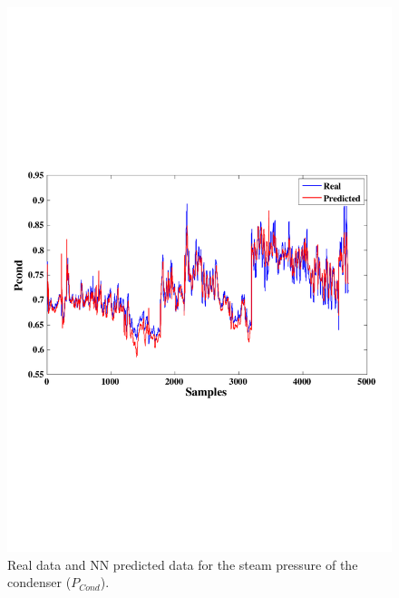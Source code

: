 \begin{figure}
\centering
\includegraphics[width=1\textwidth]{figures/ANN-STcond.pdf}
\caption{Real data and NN predicted data for the steam pressure of the condenser  ($P_{Cond}$).}
\label{Pcond}
\end{figure}

